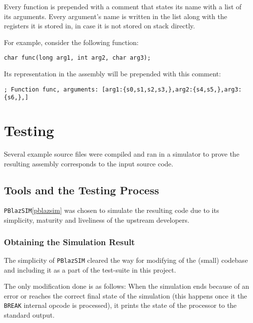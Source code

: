             Every function is prepended with a comment that states its name with a list of its arguments. Every argument's name is written in the list along with the registers it is stored in, in case it is not stored on stack directly.

            For example, consider the following function:

            \begin{center}\texttt{char func(long arg1, int arg2, char arg3);}\end{center}

            Its representation in the assembly will be prepended with this comment:

            \begin{center}\texttt{; Function func, arguments: [arg1:\{s0,s1,s2,s3,\},arg2:\{s4,s5,\},arg3:\{s6,\},]}\end{center}

            

    \section{Testing}

    Several example source files were compiled and ran in a simulator to prove the resulting assembly corresponds to the input source code.

        \subsection{Tools and the Testing Process}

        \texttt{PBlazSIM}\ref{pblazsim} was chosen to simulate the resulting code due to its simplicity, maturity and liveliness of the upstream developers. 

            \subsubsection{Obtaining the Simulation Result}

                The simplicity of \texttt{PBlazSIM} cleared the way for modifying of the (small) codebase and including it as a part of the test-suite in this project.

                The only modification done is as follows: When the simulation ends because of an error or reaches the correct final state of the simulation (this happens once it  the \texttt{BREAK} internal opcode is processed), it prints the state of the processor to the standard output.

